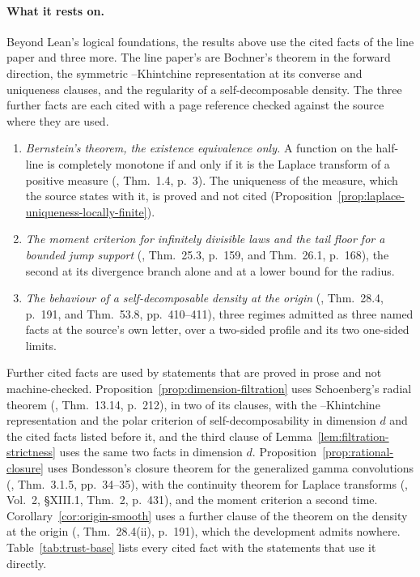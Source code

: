 \paragraph{What it rests on.} Beyond Lean's logical foundations, the results above use the
cited facts of the line paper and three more. The line paper's are Bochner's theorem in the
forward direction, the symmetric \Levy--Khintchine representation at its converse and
uniqueness clauses, and the regularity of a self-decomposable density. The three further
facts are each cited with a page reference checked against the source where they are used.
\begin{enumerate}
\item \emph{Bernstein's theorem, the existence equivalence only.} A function on the half-line
is completely monotone if and only if it is the Laplace transform of a positive measure
(, Thm.~1.4, p.~3). The uniqueness of the measure, which the
source states with it, is proved and not cited (Proposition~\ref{prop:laplace-uniqueness-locally-finite}).
\item \emph{The moment criterion for infinitely divisible laws and the tail floor for a
bounded jump support} (, Thm.~25.3, p.~159, and Thm.~26.1, p.~168), the
second at its divergence branch alone and at a lower bound for the radius.
\item \emph{The behaviour of a self-decomposable density at the origin} (,
Thm.~28.4, p.~191, and Thm.~53.8, pp.~410--411), three regimes admitted as three named facts
at the source's own letter, over a two-sided profile and its two one-sided limits.
\end{enumerate}
Further cited facts are used by statements that are proved in prose and not machine-checked.
Proposition~\ref{prop:dimension-filtration} uses Schoenberg's radial theorem
(, Thm.~13.14, p.~212), in two of its clauses, with the
\Levy--Khintchine representation and the polar criterion of self-decomposability in dimension
$d$ and the cited facts listed before it, and the third clause of
Lemma~\ref{lem:filtration-strictness} uses the same two facts in dimension $d$.
Proposition~\ref{prop:rational-closure} uses Bondesson's closure theorem for the generalized
gamma convolutions (, Thm.~3.1.5, pp.~34--35), with the
continuity theorem for Laplace transforms (, Vol.~2, \S XIII.1,
Thm.~2, p.~431), and the moment criterion a second time.
Corollary~\ref{cor:origin-smooth} uses a further clause of the theorem on the density at the
origin (, Thm.~28.4(ii), p.~191), which the development admits nowhere.
Table~\ref{tab:trust-base} lists every cited fact with the statements that use it directly.

